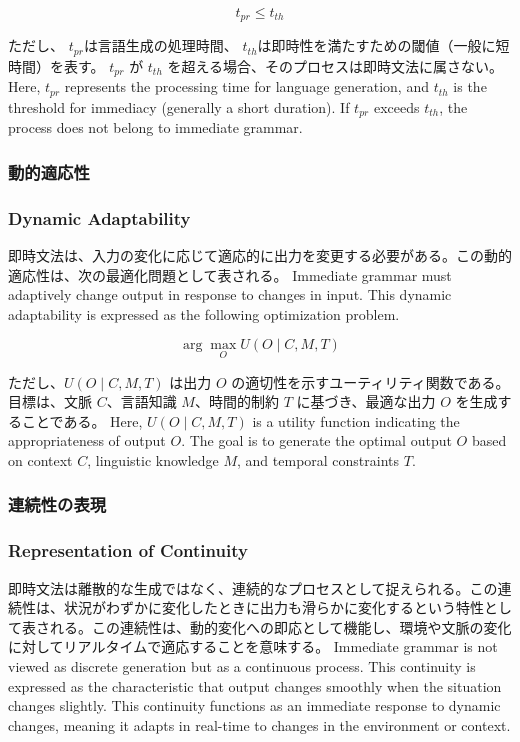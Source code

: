 \documentclass[a4paper,xelatex,ja=standard]{bxjsarticle}
\begin{document}
\[
  t_{pr} \leq t_{th}
\]

\ifJPN
ただし、
\( t_{pr} \)は言語生成の処理時間、
\( t_{th} \)は即時性を満たすための閾値（一般に短時間）を表す。
\( t_{pr} \) が \( t_{th} \) を超える場合、そのプロセスは即時文法に属さない。
\else
  Here, \( t_{pr} \) represents the processing time for language generation, and \( t_{th} \) is the threshold for immediacy (generally a short duration). If \( t_{pr} \) exceeds \( t_{th} \), the process does not belong to immediate grammar.
\fi  

\ifJPN
\subsubsection{動的適応性}
\else
\subsubsection{Dynamic Adaptability}
\fi

\ifJPN
即時文法は、入力の変化に応じて適応的に出力を変更する必要がある。この動的適応性は、次の最適化問題として表される。
\else
Immediate grammar must adaptively change output in response to changes in input. This dynamic adaptability is expressed as the following optimization problem.
\fi

\[
\arg\max_{O} U(O \mid C, M, T)
\]

\ifJPN
ただし、\( U(O \mid C, M, T) \) は出力 \( O \) の適切性を示すユーティリティ関数である。目標は、文脈 \( C \)、言語知識 \( M \)、時間的制約 \( T \) に基づき、最適な出力 \( O \) を生成することである。
\else
Here, \( U(O \mid C, M, T) \) is a utility function indicating the appropriateness of output \( O \). The goal is to generate the optimal output \( O \) based on context \( C \), linguistic knowledge \( M \), and temporal constraints \( T \).
\fi

\ifJPN
\subsubsection{連続性の表現}
\else
\subsubsection{Representation of Continuity}
\fi

\ifJPN
即時文法は離散的な生成ではなく、連続的なプロセスとして捉えられる。この連続性は、状況がわずかに変化したときに出力も滑らかに変化するという特性として表される。この連続性は、動的変化への即応として機能し、環境や文脈の変化に対してリアルタイムで適応することを意味する。
\else
Immediate grammar is not viewed as discrete generation but as a continuous process. This continuity is expressed as the characteristic that output changes smoothly when the situation changes slightly. This continuity functions as an immediate response to dynamic changes, meaning it adapts in real-time to changes in the environment or context.
\fi
\end{document}
